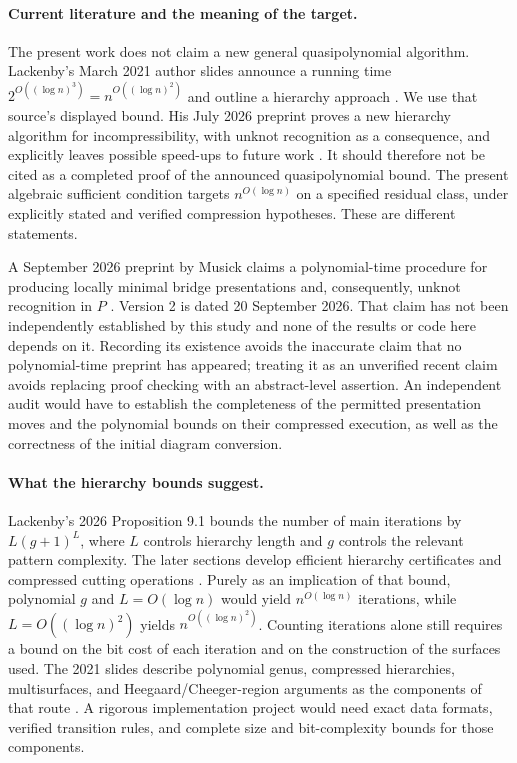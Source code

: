
\paragraph{Current literature and the meaning of the target.}
The present work does not claim a new general quasipolynomial algorithm.
Lackenby's March 2021 author slides announce a running time
$2^{O((\log n)^3)}=n^{O((\log n)^2)}$ and outline a hierarchy approach
\cite{Lackenby2021Slides}. We use that source's displayed bound.
His July 2026 preprint proves a new hierarchy
algorithm for incompressibility, with unknot recognition as a consequence,
and explicitly leaves possible speed-ups to future work
\cite{Lackenby2026Hierarchies}.  It should therefore not be cited as a
completed proof of the announced quasipolynomial bound.  The present
algebraic sufficient condition targets $n^{O(\log n)}$ on a specified
residual class, under explicitly stated and verified compression hypotheses.
These are different statements.

A September 2026 preprint by Musick claims a polynomial-time procedure
for producing locally minimal bridge presentations and, consequently,
unknot recognition in $P$ \cite{Musick2026}.  Version 2 is dated
20 September 2026.  That claim has not been independently established by
this study and none of the results or code here depends on it.  Recording
its existence avoids the inaccurate claim that no polynomial-time preprint
has appeared; treating it as an unverified recent claim avoids replacing
proof checking with an abstract-level assertion.  An independent audit
would have to establish the completeness of the permitted presentation
moves and the polynomial bounds on their compressed execution, as well as
the correctness of the initial diagram conversion.

\paragraph{What the hierarchy bounds suggest.}
Lackenby's 2026 Proposition 9.1 bounds the number of main iterations by
$L(g+1)^L$, where $L$ controls hierarchy length and $g$ controls the
relevant pattern complexity.  The later sections develop efficient
hierarchy certificates and compressed cutting operations
\cite{Lackenby2026Hierarchies}.  Purely as an implication of that bound,
polynomial $g$ and $L=O(\log n)$ would yield $n^{O(\log n)}$
iterations, while $L=O((\log n)^2)$ yields
$n^{O((\log n)^2)}$.  Counting iterations alone still requires a bound
on the bit cost of each iteration and on the construction of the
surfaces used.  The 2021 slides describe polynomial genus, compressed
hierarchies, multisurfaces, and Heegaard/Cheeger-region arguments as the
components of that route \cite{Lackenby2021Slides}.  A rigorous
implementation project would need exact data formats, verified transition
rules, and complete size and bit-complexity bounds for those components.
